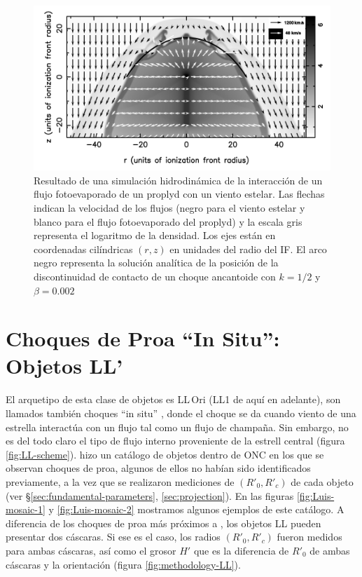\begin{figure}
  \includegraphics[width=0.7\linewidth]{./Figures/GA-simulation}
  \caption{Resultado de una simulación hidrodinámica de la interacción de un flujo fotoevaporado de un proplyd con un viento estelar. Las flechas indican la velocidad de los flujos (negro para el viento estelar y blanco para el flujo fotoevaporado del proplyd) y la escala gris representa el logaritmo de la densidad. Los ejes están en coordenadas cilíndricas $(r, z)$ en unidades del radio del IF. El arco negro representa la solución analítica de la posición de la discontinuidad de contacto de un choque ancantoide con $k=1/2$ y $\beta=0.002$ \citep{Garcia-Arredondo:2001}}
  \label{fig:simulation}
\end{figure}

\section[Objetos LL]{Choques de Proa ``In Situ'': Objetos LL'}

El arquetipo de esta clase de objetos es LL\,Ori (LL1 de aquí en adelante), son llamados también choques ``in situ'' \citep{Kobulnicky:2016}, donde el choque se da cuando viento de una estrella interactúa con un flujo tal como un flujo de champaña. Sin embargo, no es del todo claro el tipo de flujo interno proveniente de la estrell central (figura \ref{fig:LL-scheme}). \citet{Gutierrez-Soto:2015a} hizo un catálogo de objetos dentro de ONC en los que se observan choques de proa, algunos de ellos no habían sido identificados previamente, a la vez que se realizaron mediciones de $(R'_0, R'_c)$ de cada objeto (ver \S \ref{sec:fundamental-parameters}, \ref{sec:projection}). En las figuras \ref{fig:Luis-mosaic-1} y \ref{fig:Luis-mosaic-2} mostramos algunos ejemplos de este catálogo. A diferencia de los choques de proa más próximos a \thC{}, los objetos LL pueden presentar dos cáscaras. Si ese es el caso, los radios $(R'_0, R'_c)$ fueron medidos para ambas cáscaras, así como el grosor $H'$ que es la diferencia de $R'_0$ de ambas cáscaras y la orientación (figura \ref{fig:methodology-LL}).

